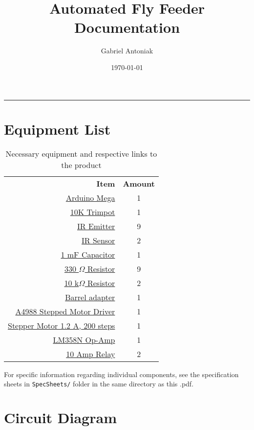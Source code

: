 \documentclass[12pt]{article}
\title{Automated Fly Feeder Documentation}
\author{Gabriel Antoniak}
\date{\today}
\newcommand{\divider}{\vspace*{-4mm} \rule{\linewidth}{1pt} \vspace{-4pt} }
\begin{document}
\maketitle
\divider

\section{Equipment List}
\renewcommand{\arraystretch}{1.2}
\begin{table}[H]
	\centering
	\begin{tabular}{| r | c |} \toprule
		\textbf{Item}  & \textbf{Amount} \\ \cline{1-2}
		\href{https://store.arduino.cc/usa/arduino-mega-2560-rev3}{Arduino Mega}   &  1\\
		\href{https://www.sparkfun.com/products/9806}{10K Trimpot}    &  1\\
		\href{https://www.sparkfun.com/products/241}{IR Emitter}     &  9\\
		\href{https://www.sparkfun.com/products/241}{IR Sensor}      &  2\\
		\href{https://www.sparkfun.com/products/8982}{1 mF Capacitor} &  1\\
		\href{https://www.sparkfun.com/products/14490}{330 $\Omega$ Resistor} &  9\\ 
		\href{https://www.sparkfun.com/products/14491}{10 k$\Omega$ Resistor} &  2\\
		\href{https://www.sparkfun.com/products/10811}{Barrel adapter} &  1\\
		\href{https://www.pololu.com/product/2128}{A4988 Stepped Motor Driver} &  1\\
		\href{https://www.pololu.com/product/1200}{Stepper Motor 1.2 A, 200 steps} & 1\\
		\href{https://www.sparkfun.com/products/9456}{LM358N Op-Amp} & 1\\
		\href{https://www.sparkfun.com/products/13815}{10 Amp Relay}  & 2\\ \bottomrule
	\end{tabular}
	\caption{Necessary equipment and respective links to the product}
	\label{tbl:equipment}
\end{table}

For specific information regarding individual components, see the specification sheets in \texttt{SpecSheets/} folder in the same directory as this .pdf.

\section{Circuit Diagram}

\end{document}
